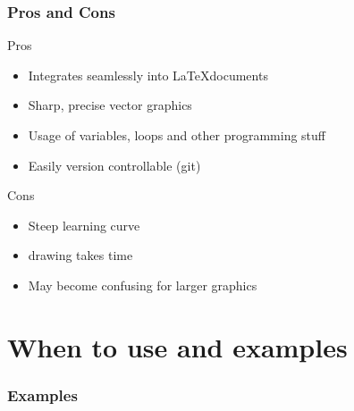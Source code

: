 \documentclass{beamer}
\begin{document}

\begin{frame}
\frametitle{Pros and Cons}
Pros
\begin{itemize}
\item Integrates seamlessly into \LaTeX documents
\item Sharp, precise vector graphics
\item Usage of variables, loops and other programming stuff
\item Easily version controllable (git)
\end{itemize}
\vspace{1em}
Cons
\begin{itemize}
    \item Steep learning curve
    \item drawing takes time
    \item May become confusing for larger graphics
\end{itemize}
\end{frame}


\section{When to use and examples}

\begin{frame}
    \frametitle{Examples}
       \begin{minipage}{0.25\textwidth}
        
       \end{minipage}
       \begin{minipage}{0.7\textwidth}
         
         \vspace{-5em}
         \begin{figure}
            \centering
         
         \end{figure}
       \end{minipage}
\end{frame}


\begin{frame}
    
\end{frame}

\end{document}

